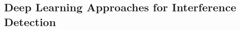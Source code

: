 \documentclass[conference]{IEEEtran}
\begin{document}
\subsection{Deep Learning Approaches for Interference Detection}
\label{ssec:related_works}




\end{document}
